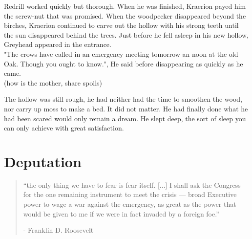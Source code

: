 \documentclass[smalldemyvopaper,11pt,twoside,onecolumn,openright,extrafontsizes]{memoir}
\begin{document}
Redrill worked quickly but thorough. When he was finished, Kraerion payed him the screw-nut that was promised. When the woodpecker disappeared beyond the birches, Kraerion continued to carve out the hollow with his strong teeth until the sun disappeared behind the trees. Just before he fell asleep in his new hollow, Greyhead appeared in the entrance. \\

"The crows have called in an emergency meeting tomorrow an noon at the old Oak. Though you ought to know.", He said before disappearing as quickly as he came.\\

(how is the mother, share spoils)

The hollow was still rough, he had neither had the time to smoothen the wood, nor carry up moss to make a bed. It did not matter. He had finally done what he had been scared would only remain a dream. He slept deep, the sort of sleep you can only achieve with great satisfaction.  

\chapter{Deputation}


\vspace{-1.3cm}
\begin{localsize}{10}
	\begin{quote}
		“the only thing we have to fear is fear itself. [...] I shall ask the Congress for the one remaining instrument to meet the crisis — broad Executive power to wage a war against the emergency, as great as the power that would be given to me if we were in fact invaded by a foreign foe.”
		\begin{flushright}- Franklin D. Roosevelt \end{flushright}
	\end{quote} 
\end{localsize}
\vspace{1cm}
\end{document}
